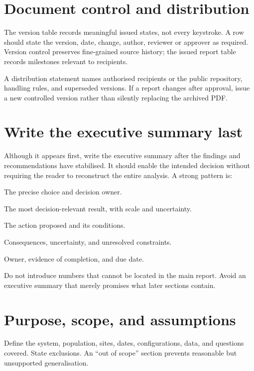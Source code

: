 \section{Document control and distribution}

The version table records meaningful issued states, not every keystroke. A row
should state the version, date, change, author, reviewer or approver as required.
Version control preserves fine-grained source history; the issued report table
records milestones relevant to recipients.

A distribution statement names authorised recipients or the public repository,
handling rules, and superseded versions. If a report changes after approval,
issue a new controlled version rather than silently replacing the archived PDF.

\section{Write the executive summary last}

Although it appears first, write the executive summary after the findings and
recommendations have stabilised. It should enable the intended decision without
requiring the reader to reconstruct the entire analysis. A strong pattern is:

\begin{description}[style=nextline,leftmargin=1.6em]
  \item[Decision required] The precise choice and decision owner.
  \item[Evidence and finding] The most decision-relevant result, with scale and
  uncertainty.
  \item[Recommendation] The action proposed and its conditions.
  \item[Principal risks] Consequences, uncertainty, and unresolved constraints.
  \item[Next step] Owner, evidence of completion, and due date.
\end{description}

Do not introduce numbers that cannot be located in the main report. Avoid an
executive summary that merely promises what later sections contain.

\section{Purpose, scope, and assumptions}

Define the system, population, sites, dates, configurations, data, and questions
covered. State exclusions. An ``out of scope'' section prevents reasonable but
unsupported generalisation.

